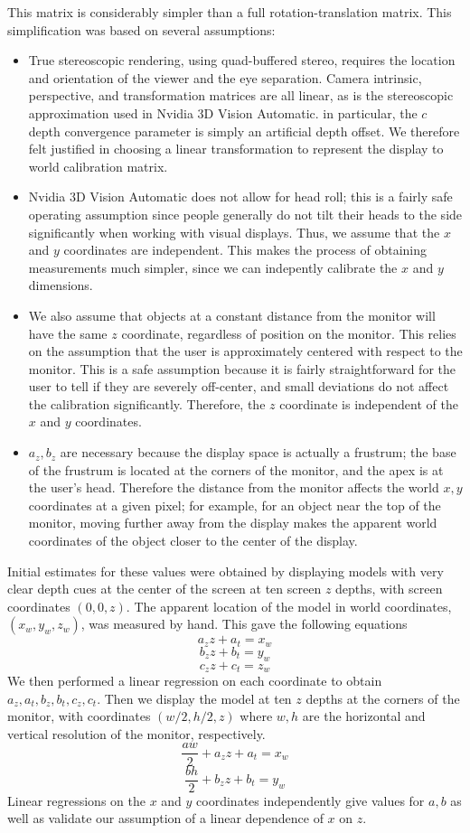 \documentclass[pageno]{jpaper}
\begin{document}
This matrix is considerably simpler than a full rotation-translation matrix. This simplification was based on several assumptions:
\begin{itemize}
\item True stereoscopic rendering, using quad-buffered stereo, requires the location and orientation of the viewer and the eye separation.
Camera intrinsic, perspective, and transformation matrices are all linear, as is the stereoscopic approximation used in Nvidia 3D Vision
Automatic. in particular, the $c$ depth convergence parameter is simply an artificial depth offset. We therefore felt justified in choosing
a linear transformation to represent the display to world calibration matrix.
\item Nvidia 3D Vision Automatic does not allow for head roll; this is a fairly safe operating assumption since people generally do
not tilt their heads to the side significantly when working with visual displays. Thus, we assume that the $x$ and $y$ coordinates are
independent. This makes the process of obtaining measurements much simpler, since we can indepently calibrate the $x$ and $y$ dimensions.
\item We also assume that objects at a constant distance from the monitor will have the same $z$ coordinate, regardless
of position on the monitor. This relies on the assumption that the user is approximately centered with respect to the monitor. This is
a safe assumption because it is fairly straightforward for the user to tell if they are severely off-center, and small deviations
do not affect the calibration significantly. Therefore, the $z$ coordinate is independent of the $x$ and $y$ coordinates.
\item $a_z, b_z$ are necessary because the display space is actually a frustrum; the base of the frustrum is located at the corners of
the monitor, and the apex is at the user's head. Therefore the distance from the monitor affects the world $x,y$ coordinates at a given
pixel; for example, for an object near the top of the monitor, moving further away from the display makes the apparent world coordinates of the
object closer to the center of the display.
\end{itemize}

Initial estimates for these values were obtained by displaying models with very clear depth cues at the center of the screen at ten screen $z$ depths,
with screen coordinates $(0,0,z)$. The apparent location of the model in world coordinates, $(x_w, y_w, z_w)$, was measured by hand. This gave the following equations
$$a_zz + a_t = x_w$$
$$b_zz + b_t = y_w$$
$$c_zz + c_t = z_w$$
We then performed a linear regression on each coordinate to obtain $a_z, a_t, b_z, b_t, c_z, c_t$.
Then we display the model at ten $z$ depths at the corners of the monitor, with coordinates $(w/2, h/2, z)$ where $w,h$ are the horizontal and vertical
resolution of the monitor, respectively.
$$\frac{aw}{2} + a_zz + a_t = x_w$$
$$\frac{bh}{2} + b_zz + b_t = y_w$$
Linear regressions on the $x$ and $y$ coordinates independently give values for $a,b$ as well as validate our assumption of a linear dependence of $x$ on $z$.
\end{document}
